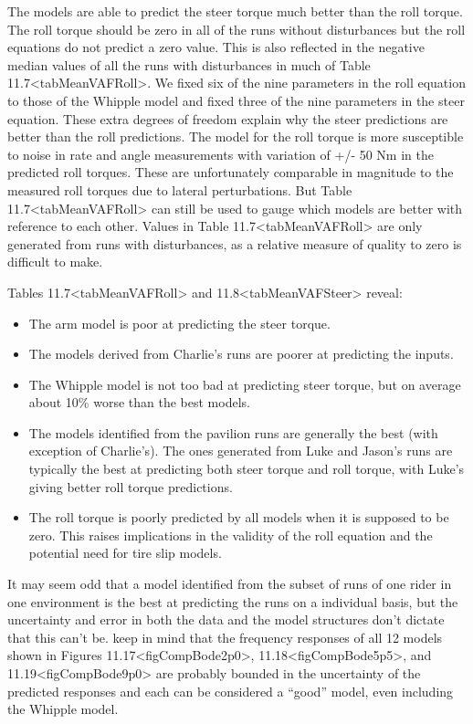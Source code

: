 \documentclass[a4paper]{article}
\begin{document}
The models are able to predict the steer torque much better than the
roll torque. The roll torque should be zero in all of the runs without
disturbances but the roll equations do not predict a zero value. This is
also reflected in the negative median values of all the runs with
disturbances in much of
Table 11.7\textless{}tabMeanVAFRoll\textgreater{}. We fixed six of the
nine parameters in the roll equation to those of the Whipple model and
fixed three of the nine parameters in the steer equation. These extra
degrees of freedom explain why the steer predictions are
better than the roll predictions. The model for the roll torque is more
susceptible to noise in rate and angle measurements with variation of
+/- 50 Nm in the predicted roll torques. These
are unfortunately comparable in magnitude to the measured roll torques
due to lateral perturbations. But Table
11.7\textless{}tabMeanVAFRoll\textgreater{} can still be used to gauge
which models are better with reference to each other. Values in
Table 11.7\textless{}tabMeanVAFRoll\textgreater{} are only generated
from runs with disturbances, as a relative measure of quality to
zero is difficult to make.

Tables 11.7\textless{}tabMeanVAFRoll\textgreater{} and
11.8\textless{}tabMeanVAFSteer\textgreater{} reveal:

\begin{itemize}
  \item
    The arm model is poor at predicting the steer torque.
  \item
    The models derived from Charlie's runs are poorer at predicting the
    inputs.
  \item
    The Whipple model is not too bad at predicting steer torque, but on
    average about 10\% worse than the best models.
  \item
    The models identified from the pavilion runs are generally the best
    (with exception of Charlie's). The ones generated from Luke and
    Jason's runs are typically the best at predicting both steer torque
    and roll torque, with Luke's giving better roll torque predictions.
  \item
    The roll torque is poorly predicted by all models when it is supposed
    to be zero. This raises implications in the validity of the roll
    equation and the potential need for tire slip models.
\end{itemize}

It may seem odd that a model identified from the subset of runs of one
rider in one environment is the best at predicting the runs on a
individual basis, but the uncertainty and error in both the data and the
model structures don't dictate that this can't be. %
keep in mind that the frequency responses of all 12 models shown in Figures
11.17\textless{}figCompBode2p0\textgreater{},
11.18\textless{}figCompBode5p5\textgreater{}, and
11.19\textless{}figCompBode9p0\textgreater{} are probably bounded in the
uncertainty of the predicted responses and each can be considered a
``good'' model, even including the Whipple model.
\end{document}
